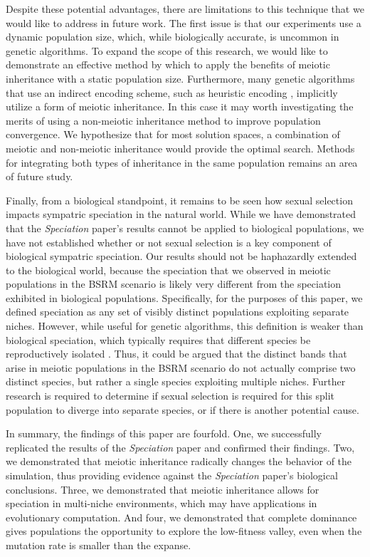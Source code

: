 \documentclass[conference]{IEEEtran}
\begin{document}
Despite these potential advantages, there are limitations to this technique that we would like to address in future work. The first issue is that our experiments use a dynamic population size, which, while biologically accurate, is uncommon in genetic algorithms. To expand the scope of this research, we would like to demonstrate an effective method by which to apply the benefits of meiotic inheritance with a static population size. Furthermore, many genetic algorithms that use an indirect encoding scheme, such as heuristic encoding \cite{CARLSON}, implicitly utilize a form of meiotic inheritance. In this case it may worth investigating the merits of using a non-meiotic inheritance method to improve population convergence. We hypothesize that for most solution spaces,  a combination of meiotic and non-meiotic inheritance would provide the optimal search. Methods for integrating both types of inheritance in the same population remains an area of future study. 

Finally, from a biological standpoint, it remains to be seen how sexual selection impacts sympatric speciation in the natural world. While we have demonstrated that the \textit{Speciation} paper’s results cannot be applied to biological populations, we have not established whether or not sexual selection is a key component of biological sympatric speciation. Our results should not be haphazardly extended to the biological world, because the speciation that we observed in meiotic populations in the BSRM scenario is likely very different from the speciation exhibited in biological populations. Specifically, for the purposes of this paper, we defined speciation as any set of visibly distinct populations exploiting separate niches. However, while useful for genetic algorithms, this definition is weaker than biological speciation, which typically requires that different species be reproductively isolated \cite{TEXTBOOK}. Thus, it could be argued that the distinct bands that arise in meiotic populations in the BSRM scenario do not actually comprise two distinct species, but rather a single species exploiting multiple niches. Further research is required to determine if sexual selection is required for this split population to diverge into separate species, or if there is another potential cause.

In summary, the findings of this paper are fourfold. One, we successfully replicated the results of the \textit{Speciation} paper and confirmed their findings. Two, we demonstrated that meiotic inheritance radically changes the behavior of the simulation, thus providing evidence against the \textit{Speciation} paper's biological conclusions. Three, we demonstrated that meiotic inheritance allows for speciation in multi-niche environments, which may have applications in evolutionary computation. And four, we demonstrated that complete dominance gives populations the opportunity to explore the low-fitness valley, even when the mutation rate is smaller than the expanse. 
\end{document}
